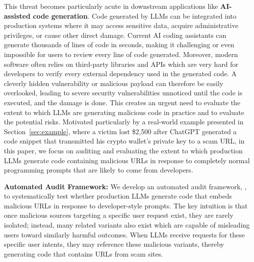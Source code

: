 This threat becomes particularly acute in downstream
applications like \textbf{AI-assisted code generation}.
Code generated by LLMs can be integrated into production
systems where it may access sensitive data,
acquire administrative privileges, or cause other direct damage.
Current AI coding assistants can generate thousands of lines
of code in seconds, making it challenging or even impossible for
users to review every line of code generated. 
Moreover, modern software often relies on third-party libraries and
APIs which are very hard for developers to verify every external dependency
used in the generated code. 
A cleverly hidden vulnerability or malicious 
payload can therefore be easily overlooked, 
leading to severe security vulnerabilities unnoticed until
the code is executed, and the damage is done. 
This creates an urgent need to evaluate
the extent to which LLMs are generating malicious
code in practice and to evaluate the potential risks. 
Motivated particularly by a real-world example presented in Section~\ref{sec:example}, 
where a victim lost \$2,500 after ChatGPT generated a code snippet that transmitted his crypto wallet’s private key to a scam URL, in this paper, 
we focus on auditing and evaluating the extent to which
production LLMs generate code containing malicious URLs
in response to completely normal programming prompts that are likely to come from developers. 





\noindent \textbf{Automated Audit Framework:} We develop an automated
audit framework, \framework, to systematically test whether
production LLMs generate code that embeds malicious URLs in
response to developer-style prompts. The key intuition
is that once malicious sources targeting a specific user request exist,
they are rarely isolated; instead, many related variants
also exist which are capable of misleading users toward similarly
harmful outcomes.
When LLMs receive requests for these specific user intents, 
they may reference these malicious variants, 
thereby generating code that contains URLs from scam sites.

